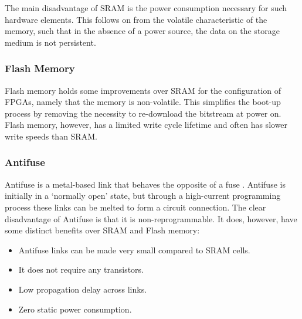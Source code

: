 The main disadvantage of \gls{SRAM} is the power consumption necessary for such
hardware elements. This follows on from the volatile characteristic of the
memory, such that in the absence of a power source, the data on the storage
medium is not persistent.

\subsubsection{Flash Memory}
\label{fpga:configuration:flash}
Flash memory holds some improvements over \gls{SRAM} for the configuration of
\glspl{FPGA}, namely that the memory is non-volatile. This simplifies the
boot-up process by removing the necessity to re-download the bitstream at power
on. Flash memory, however, has a limited write cycle lifetime and often has
slower write speeds than \gls{SRAM}.

\subsubsection{Antifuse}
\label{fpga:configuration:antifuse}
Antifuse is a metal-based link that behaves the opposite of a fuse
\cite{Hauck:2007}. Antifuse is initially in a `normally open' state, but through
a high-current programming process these links can be melted to form a circuit
connection. The clear disadvantage of Antifuse is that it is non-reprogrammable.
It does, however, have some distinct benefits over \gls{SRAM} and Flash memory:
\begin{itemize}
    \item Antifuse links can be made very small compared to \gls{SRAM} cells.
    \item It does not require any transistors.
    \item Low propagation delay across links.
    \item Zero static power consumption.
\end{itemize}